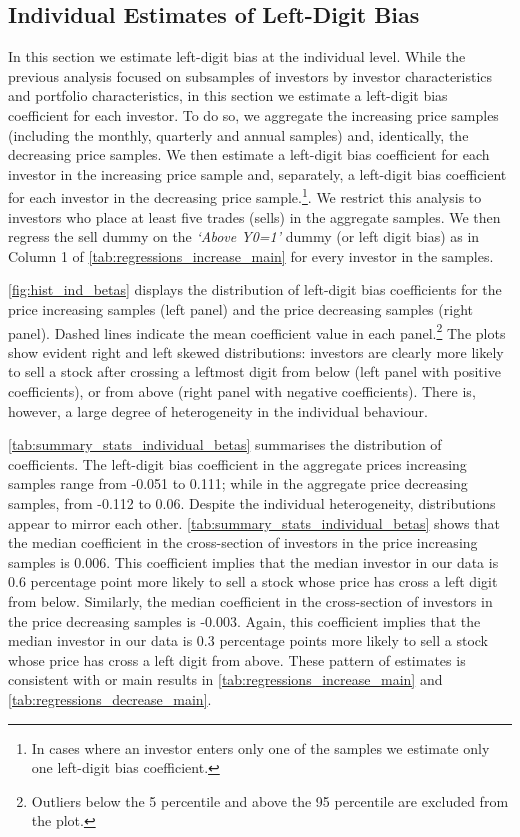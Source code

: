 \subsection{Individual Estimates of Left-Digit Bias}

In this section we estimate left-digit bias at the individual level. While the previous analysis focused on subsamples of investors by investor characteristics and portfolio characteristics, in this section we estimate a left-digit bias coefficient for each investor. To do so, we aggregate the increasing price samples (including the monthly, quarterly and annual samples) and, identically, the decreasing price samples. We then estimate a left-digit bias coefficient for each investor in the increasing price sample and, separately, a left-digit bias coefficient for each investor in the decreasing price sample.\footnote{In cases where an investor enters only one of the samples we estimate only one left-digit bias coefficient.}. We restrict this analysis to investors who place at least five trades (sells) in the aggregate samples. We then regress the sell dummy on the \textit{`Above Y0=1'} dummy (or left digit bias) as in Column 1 of \ref{tab:regressions_increase_main} for every investor in the samples.

\ref{fig:hist_ind_betas} displays the distribution of left-digit bias coefficients for the price increasing samples (left panel) and the price decreasing samples (right panel). Dashed lines indicate the mean coefficient value in each panel.\footnote{Outliers below the 5 percentile and above the 95 percentile are excluded from the plot.} The plots show evident right and left skewed distributions: investors are clearly more likely to sell a stock after crossing a leftmost digit from below (left panel with positive coefficients), or from above (right panel with negative coefficients). There is, however, a large degree of heterogeneity in the individual behaviour. 

\ref{tab:summary_stats_individual_betas} summarises the distribution of coefficients. The left-digit bias coefficient in the aggregate prices increasing samples range from -0.051 to 0.111; while in the aggregate price decreasing samples, from -0.112 to 0.06. Despite the individual heterogeneity, distributions appear to mirror each other. \ref{tab:summary_stats_individual_betas} shows that the median coefficient in the cross-section of investors in the price increasing samples is 0.006.  This coefficient implies that the median investor in our data is 0.6 percentage point more likely to sell a stock whose price has cross a left digit from below. Similarly, the median coefficient in the cross-section of investors in the price decreasing samples is -0.003. Again, this coefficient implies that the median investor in our data is 0.3 percentage points more likely to sell a stock whose price has cross a left digit from above. These pattern of estimates is consistent with or main results in \ref{tab:regressions_increase_main} and \ref{tab:regressions_decrease_main}.

